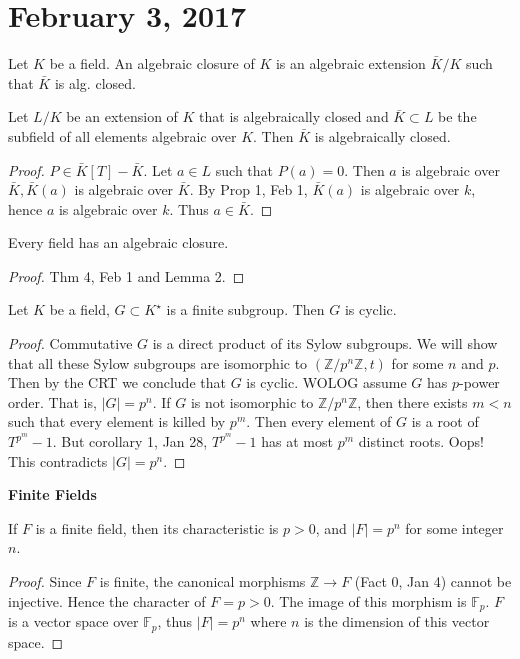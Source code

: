 \section{February 3, 2017}

\begin{defn}
Let $K$ be a field. An algebraic closure of $K$ is an algebraic extension $\bar{K}/K$ such that $\bar{K}$ is alg. closed.
\end{defn}
\begin{lemma}
Let $L/K$ be an extension of $K$ that is algebraically closed and $\bar{K}\subset L$ be the subfield of all elements algebraic over $K$. Then $\bar{K}$ is algebraically closed.
\end{lemma}
\begin{proof}
$P\in \bar{K}[T]-\bar{K}.$ Let $a\in L$ such that $P(a)=0$. Then $a$ is algebraic over $\bar{K},\bar{K}(a)$ is algebraic over $\bar{K}$. By Prop 1, Feb 1, $\bar{K}(a)$ is algebraic over $k$, hence $a$ is algebraic over $k$. Thus $a\in\bar{K}$.
\end{proof}
\begin{cor}
Every field has an algebraic closure.
\end{cor}
\begin{proof}
Thm 4, Feb 1 and Lemma 2.
\end{proof}
\begin{prop}
Let $K$ be a field, $G\subset K^{\star}$ is a finite subgroup. Then $G$ is cyclic.
\end{prop}
\begin{proof}
Commutative $G$ is a direct product of its Sylow subgroups. We will show that all these Sylow subgroups are isomorphic to $(\mathbb{Z}/p^n\mathbb{Z},t)$ for some $n$ and $p$. Then by the CRT we conclude that $G$ is cyclic. WOLOG assume $G$ has $p$-power order. That is, $|G|=p^n$. If $G$ is not isomorphic to $\mathbb{Z}/p^n\mathbb{Z}$, then there exists $m<n$ such that every element is killed by $p^m$. Then every element of $G$ is a root of $T^{p^m}-1$. But corollary 1, Jan 28, $T^{p^m}-1$ has at most $p^m$ distinct roots. Oops! This contradicts $|G|=p^n$.
\end{proof}
\noindent \textbf{Finite Fields}
\begin{fact}
If $F$ is a finite field, then its characteristic is $p>0$, and $|F|=p^n$ for some integer $n$.
\end{fact}
\begin{proof}
Since $F$ is finite, the canonical morphisms $\mathbb{Z}\longrightarrow F$ (Fact 0, Jan 4) cannot be injective. Hence the character of $F=p>0$. The image of this morphism is $\mathbb{F}_p$. $F$ is a vector space over $\mathbb{F}_p$, thus $|F|=p^n$ where $n$ is the dimension of this vector space.
\end{proof}
